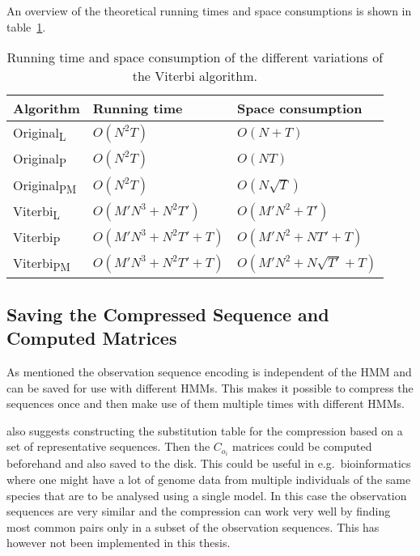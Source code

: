 An overview of the theoretical running times and space consumptions is shown in
table~\ref{tab:running-time}.

\begin{table}
  \centering
  \caption{Running time and space consumption of the different variations of the
    Viterbi algorithm.}
  \label{tab:running-time}
  \begin{tabular}{lll}
    \toprule
    Algorithm                   & Running time             & Space consumption             \\
    \midrule
    Original\textsubscript{L}  & $O(N^2 T)$               & $O(N + T)$                    \\
    Original\textsubscript{P}  & $O(N^2 T)$               & $O(NT)$                       \\
    Original\textsubscript{PM} & $O(N^2 T)$               & $O(N\sqrt{T})$                \\
    Viterbi\textsubscript{L}    & $O(M' N^3 + N^2 T')$     & $O(M' N^2 + T')$              \\
    Viterbi\textsubscript{P}    & $O(M' N^3 + N^2 T' + T)$ & $O(M' N^2 + N T' + T)$        \\
    Viterbi\textsubscript{PM}   & $O(M' N^3 + N^2 T' + T)$ & $O(M' N^2 + N \sqrt{T'} + T)$ \\
    \bottomrule
  \end{tabular}
\end{table}

\subsection{Saving the Compressed Sequence and Computed Matrices}
\label{sec:saving-compr-sequ}

As mentioned the observation sequence encoding is independent of the HMM and
can be saved for use with different HMMs. This makes it possible to compress
the sequences once and then make use of them multiple times
with different HMMs.

\citet{lifshits2009speeding} also suggests constructing the substitution table
for the compression based on a set of representative sequences. Then the
$C_{o_i}$ matrices could be computed beforehand and also saved to the disk.
This could be useful in e.g.\ bioinformatics where one might have a lot of
genome data from multiple individuals of the same species that are to be
analysed using a single model. In this case the observation sequences are very
similar and the compression can work very well by finding most common pairs
only in a subset of the observation sequences. This has however not been
implemented in this thesis.

